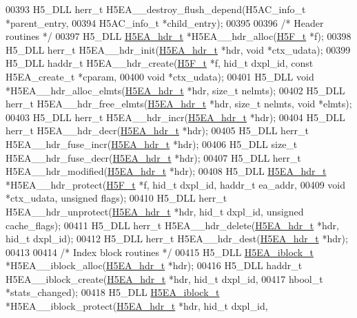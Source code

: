 \begin{DoxyCode}
00393 H5\_DLL herr\_t H5EA\_\_destroy\_flush\_depend(H5AC\_info\_t *parent\_entry,
00394     H5AC\_info\_t *child\_entry);
00395 
00396 \textcolor{comment}{/* Header routines */}
00397 H5\_DLL \hyperlink{struct_h5_e_a__hdr__t}{H5EA\_hdr\_t} *H5EA\_\_hdr\_alloc(\hyperlink{struct_h5_f__t}{H5F\_t} *f);
00398 H5\_DLL herr\_t H5EA\_\_hdr\_init(\hyperlink{struct_h5_e_a__hdr__t}{H5EA\_hdr\_t} *hdr, \textcolor{keywordtype}{void} *ctx\_udata);
00399 H5\_DLL haddr\_t H5EA\_\_hdr\_create(\hyperlink{struct_h5_f__t}{H5F\_t} *f, hid\_t dxpl\_id, \textcolor{keyword}{const} H5EA\_create\_t *cparam,
00400     \textcolor{keywordtype}{void} *ctx\_udata);
00401 H5\_DLL \textcolor{keywordtype}{void} *H5EA\_\_hdr\_alloc\_elmts(\hyperlink{struct_h5_e_a__hdr__t}{H5EA\_hdr\_t} *hdr, \textcolor{keywordtype}{size\_t} nelmts);
00402 H5\_DLL herr\_t H5EA\_\_hdr\_free\_elmts(\hyperlink{struct_h5_e_a__hdr__t}{H5EA\_hdr\_t} *hdr, \textcolor{keywordtype}{size\_t} nelmts, \textcolor{keywordtype}{void} *elmts);
00403 H5\_DLL herr\_t H5EA\_\_hdr\_incr(\hyperlink{struct_h5_e_a__hdr__t}{H5EA\_hdr\_t} *hdr);
00404 H5\_DLL herr\_t H5EA\_\_hdr\_decr(\hyperlink{struct_h5_e_a__hdr__t}{H5EA\_hdr\_t} *hdr);
00405 H5\_DLL herr\_t H5EA\_\_hdr\_fuse\_incr(\hyperlink{struct_h5_e_a__hdr__t}{H5EA\_hdr\_t} *hdr);
00406 H5\_DLL \textcolor{keywordtype}{size\_t} H5EA\_\_hdr\_fuse\_decr(\hyperlink{struct_h5_e_a__hdr__t}{H5EA\_hdr\_t} *hdr);
00407 H5\_DLL herr\_t H5EA\_\_hdr\_modified(\hyperlink{struct_h5_e_a__hdr__t}{H5EA\_hdr\_t} *hdr);
00408 H5\_DLL \hyperlink{struct_h5_e_a__hdr__t}{H5EA\_hdr\_t} *H5EA\_\_hdr\_protect(\hyperlink{struct_h5_f__t}{H5F\_t} *f, hid\_t dxpl\_id, haddr\_t ea\_addr,
00409     \textcolor{keywordtype}{void} *ctx\_udata, \textcolor{keywordtype}{unsigned} flags);
00410 H5\_DLL herr\_t H5EA\_\_hdr\_unprotect(\hyperlink{struct_h5_e_a__hdr__t}{H5EA\_hdr\_t} *hdr, hid\_t dxpl\_id, \textcolor{keywordtype}{unsigned} cache\_flags);
00411 H5\_DLL herr\_t H5EA\_\_hdr\_delete(\hyperlink{struct_h5_e_a__hdr__t}{H5EA\_hdr\_t} *hdr, hid\_t dxpl\_id);
00412 H5\_DLL herr\_t H5EA\_\_hdr\_dest(\hyperlink{struct_h5_e_a__hdr__t}{H5EA\_hdr\_t} *hdr);
00413 
00414 \textcolor{comment}{/* Index block routines */}
00415 H5\_DLL \hyperlink{struct_h5_e_a__iblock__t}{H5EA\_iblock\_t} *H5EA\_\_iblock\_alloc(\hyperlink{struct_h5_e_a__hdr__t}{H5EA\_hdr\_t} *hdr);
00416 H5\_DLL haddr\_t H5EA\_\_iblock\_create(\hyperlink{struct_h5_e_a__hdr__t}{H5EA\_hdr\_t} *hdr, hid\_t dxpl\_id,
00417     hbool\_t *stats\_changed);
00418 H5\_DLL \hyperlink{struct_h5_e_a__iblock__t}{H5EA\_iblock\_t} *H5EA\_\_iblock\_protect(\hyperlink{struct_h5_e_a__hdr__t}{H5EA\_hdr\_t} *hdr, hid\_t dxpl\_id,

\end{DoxyCode}
